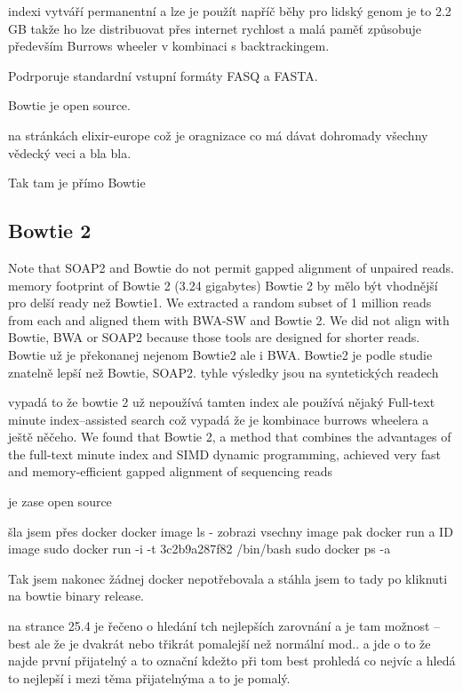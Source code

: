 \documentclass[czech,DP]{thesiskiv}
\begin{document}
indexi vytváří permanentní a lze je použít napříč běhy 
pro lidský genom je to 2.2 GB takže ho lze distribuovat přes internet
rychlost a malá paměť způsobuje především Burrows wheeler v kombinaci s backtrackingem.

Podrporuje standardní vstupní formáty FASQ a FASTA.

Bowtie je open source.

 
na stránkách elixir-europe což je oragnizace co má dávat dohromady všechny vědecký veci a bla bla.



Tak tam je přímo Bowtie \cite{bowtie}

\subsection{Bowtie 2}
Note that SOAP2 and Bowtie do not permit gapped alignment of unpaired reads.
 memory footprint of Bowtie 2 (3.24 gigabytes)
 Bowtie 2 by mělo být vhodnější pro delší ready než Bowtie1.
 We extracted a random subset of 1 million reads from each and aligned them with BWA-SW and Bowtie 2. We did not align with Bowtie, BWA or SOAP2 because those tools are designed for shorter reads.
Bowtie už je překonanej nejenom Bowtie2 ale i BWA.
Bowtie2 je podle studie znatelně lepší než Bowtie, SOAP2.
tyhle výsledky jsou na syntetických readech

vypadá to že bowtie 2 už nepoužívá tamten index ale používá nějaký Full-text minute index–assisted search což vypadá že je kombinace burrows wheelera a ještě něčeho.
We found that Bowtie 2, a method that combines the advantages of the full-text minute index and SIMD dynamic programming, achieved very fast and memory-efficient gapped alignment of sequencing reads

je zase open source
\cite{bowtie2}


šla jsem přes docker docker image ls - zobrazi vsechny image pak docker run a ID image
sudo docker run -i -t 3c2b9a287f82 /bin/bash
sudo docker ps -a

Tak jsem nakonec žádnej docker nepotřebovala a stáhla jsem to tady %
 po kliknuti na bowtie binary release.

na strance 25.4 je řečeno o hledání tch nejlepších zarovnání a je tam možnost --best ale že je dvakrát nebo třikrát pomalejší než normální mod.. a jde o to že najde první přijatelný a to označní kdežto při tom best prohledá co nejvíc a hledá to nejlepší i mezi těma přijatelnýma a to je pomalý.
\end{document}
